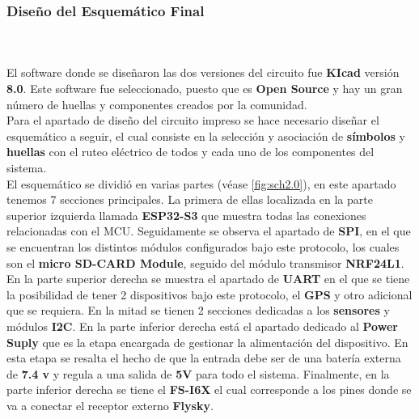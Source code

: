 \subsubsection{ Diseño del Esquemático Final}\\ \\

El software donde se diseñaron las dos versiones del circuito fue \textbf{KIcad} versión \textbf{8.0}. Este software fue seleccionado, puesto que es \textbf{Open Source} y hay un gran número de huellas y componentes creados por la comunidad. \\

Para el apartado de diseño del circuito impreso se hace necesario diseñar el esquemático a seguir, el cual consiste en la selección y asociación de \textbf{símbolos} y \textbf{huellas} con el ruteo eléctrico de todos y cada uno de los componentes del sistema. \\


El esquemático se dividió en varias partes (véase \ref{fig:sch2.0}), en este apartado tenemos 7 secciones principales. La primera de ellas localizada en la parte superior izquierda llamada \textbf{ESP32-S3} que muestra todas las conexiones relacionadas con el MCU. Seguidamente se observa el apartado de \textbf{SPI}, en el que se encuentran los distintos módulos configurados bajo este protocolo, los cuales son el \textbf{micro SD-CARD Module}, seguido del módulo transmisor \textbf{NRF24L1}. En la parte superior derecha se muestra el apartado de \textbf{UART} en el que se tiene la posibilidad de tener 2 dispositivos bajo este protocolo, el \textbf{GPS} y otro adicional que se requiera. En la mitad se tienen 2 secciones dedicadas a los \textbf{sensores} y módulos \textbf{I2C}. En la parte inferior derecha está el apartado dedicado al \textbf{Power Suply} que es la etapa encargada de gestionar la alimentación del dispositivo. En esta etapa se resalta el hecho de que la entrada debe ser de una batería externa de \textbf{7.4 v} y regula a una salida de \textbf{5V} para todo el sistema. Finalmente, en la parte inferior derecha se tiene el \textbf{FS-I6X} el cual corresponde a los pines donde se va a conectar el receptor externo \textbf{Flysky}. \\

